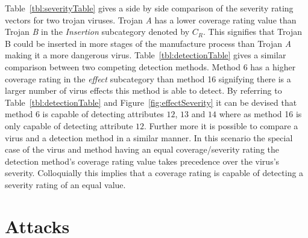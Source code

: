 Table~\ref{tbl:severityTable} gives a side by side comparison of the severity rating vectors for two trojan viruses. Trojan \textit{A} has a lower coverage rating value than Trojan \textit{B} in the \textit{Insertion} subcategory denoted by $C_R$. This signifies that Trojan B could be inserted in more stages of the manufacture process than Trojan \textit{A} making it a more dangerous virus. Table~\ref{tbl:detectionTable} gives a similar comparison between two competing detection methods. Method 6 has a higher coverage rating in the \textit{effect} subcategory than method 16 signifying there is a larger number of virus effects this method is able to detect. By referring to Table~\ref{tbl:detectionTable} and Figure~\ref{fig:effectSeverity} it can be devised that method 6 is capable of detecting attributes $12$, $13$ and $14$ where as method 16 is only capable of detecting attribute $12$. Further more it is possible to compare a virus and a detection method in a similar manner. In this scenario the special case of the virus and method having an equal coverage/severity rating the detection method's coverage rating value takes precedence over the virus's severity. Colloquially this implies that a coverage rating is capable of detecting a severity rating of an equal value.

\section{Attacks} \label{section:Attacks}

